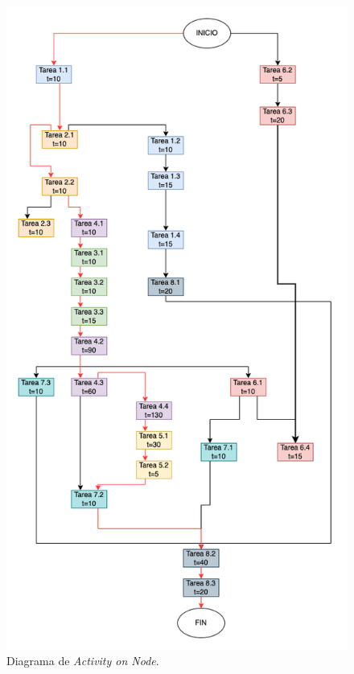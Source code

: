 \documentclass[
11pt, %
]{charter}
\begin{document}
\begin{figure}[H]
\centering 
\includegraphics[width=.75\textwidth]{./Figuras/figura2.png}
\caption{Diagrama de \textit{Activity on Node}.}
\label{fig:AoN}
\end{figure}
\end{document}
